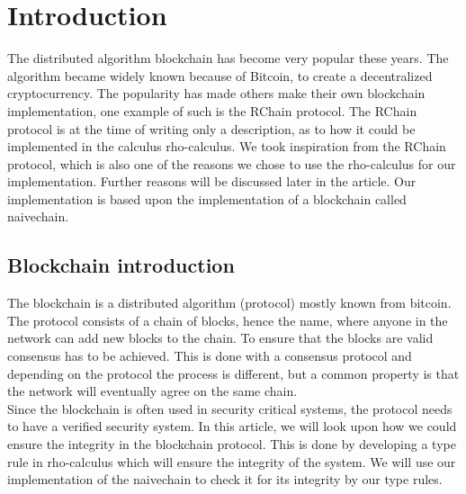 \section{Introduction}
The distributed algorithm blockchain has become very popular these years. The algorithm became widely known because of Bitcoin, to create a decentralized cryptocurrency.\citep{website:blockchain} The popularity has made others make their own blockchain implementation, one example of such is the RChain protocol. The RChain protocol is at the time of writing only a description, as to how it could be implemented in the calculus rho-calculus. We took inspiration from the RChain protocol, which is also one of the reasons we chose to use the rho-calculus for our implementation. Further reasons will be discussed later in the article. Our implementation is based upon the implementation of a blockchain called naivechain\cite{naivechain}.

\subsection*{Blockchain introduction}
The blockchain is a distributed algorithm (protocol) mostly known from bitcoin. The protocol consists of a chain of blocks, hence the name, where anyone in the network can add new blocks to the chain. To ensure that the blocks are valid consensus has to be achieved. This is done with a consensus protocol and depending on the protocol the process is different, but a common property is that the network will eventually agree on the same chain.\\
Since the blockchain is often used in security critical systems, the protocol needs to have a verified security system.\cite{website:integrity} In this article, we will look upon how we could ensure the integrity in the blockchain protocol. This is done by developing a type rule in rho-calculus which will ensure the integrity of the system. We will use our implementation of the naivechain to check it for its integrity by our type rules.
